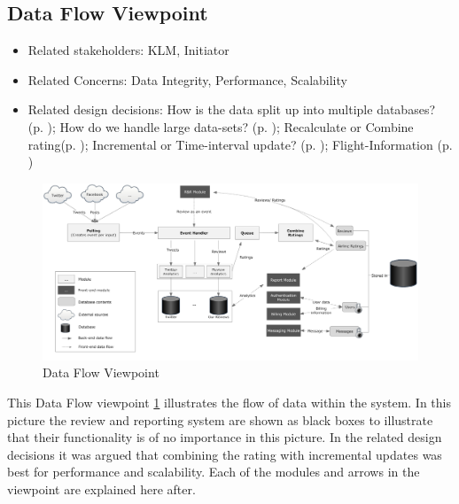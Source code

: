 % 

\subsection{Data Flow Viewpoint}

\begin{itemize}
\item Related stakeholders: KLM, Initiator
\item Related Concerns: Data Integrity, Performance, Scalability
\item Related design decisions: How is the data split up into multiple databases? (p. \pageref{dd:split}); How do we handle large data-sets? 
(p. \pageref{dd:large-data}); Recalculate or Combine rating(p. \pageref{dd:recalc-comb}); Incremental or Time-interval update? (p. \pageref{dd:inc-or-time}); Flight-Information (p. \pageref{dd:flight-inf})
\end{itemize}

\newpage
\begin{landscape}
\begin{figure}
\includegraphics[width=600px]{DataFloow}
\caption{Data Flow Viewpoint}
\label{fig:Data Flow}
\end{figure}
\end{landscape}

This Data Flow viewpoint \ref{fig:Data Flow} illustrates the flow of data within the system. In this picture the review and reporting system are shown as black boxes to illustrate that their functionality is of no importance in this picture.
In the related design decisions it was argued that combining the rating with incremental updates was best for performance and scalability.  Each of the modules and arrows in the viewpoint are explained here after.

